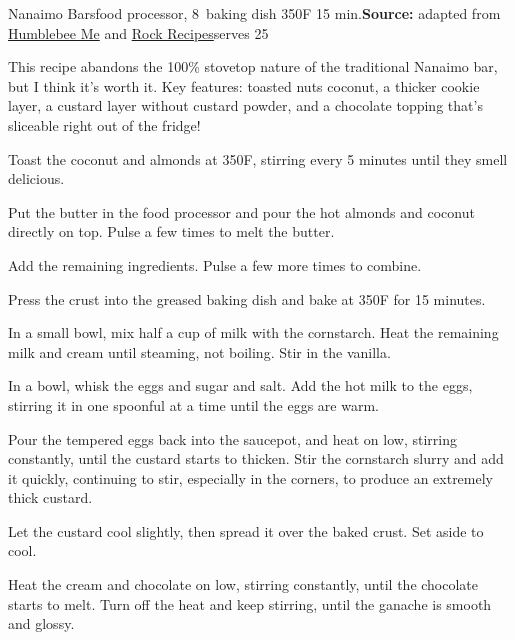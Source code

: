 \begin{recipe}{Nanaimo Bars}{food processor, 8\inch{}\inch\ baking dish \hfill 350\0F \hfill 15 min.}{\textbf{Source:} adapted from \href{https://www.humblebeeandme.com/totally-from-scratch-nanaimo-bars/}{Humblebee \And Me} and \href{https://www.rockrecipes.com/chocolate-mint-nanaimo-bars/}{Rock Recipes}\hfill serves 25}

 \freeform This recipe abandons the 100\% stovetop nature of the traditional Nanaimo bar, but I think it's worth it. Key features: toasted nuts \And coconut, a thicker cookie layer, a custard layer without custard powder, and a chocolate topping that's sliceable right out of the fridge!

 Toast the coconut and almonds at 350\0F, stirring every 5 minutes until they smell delicious.

 Put the butter in the food processor and pour the hot almonds and coconut directly on top. Pulse a few times to melt the butter.

 Add the remaining ingredients. Pulse a few more times to combine.

 \newstep Press the crust into the greased baking dish and bake at 350\0F for 15 minutes.

 In a small bowl, mix half a cup of milk with the cornstarch. Heat the remaining milk and cream until steaming, not boiling. Stir in the vanilla.

 In a bowl, whisk the eggs and sugar and salt. Add the hot milk to the eggs, stirring it in one spoonful at a time until the eggs are warm.

 \newstep Pour the tempered eggs back into the saucepot, and heat on low, stirring constantly, until the custard starts to thicken. Stir the cornstarch slurry and add it quickly, continuing to stir, especially in the corners, to produce an extremely thick custard.

 \newstep Let the custard cool slightly, then spread it over the baked crust. Set aside to cool.

 Heat the cream and chocolate on low, stirring constantly, until the chocolate starts to melt. Turn off the heat and keep stirring, until the ganache is smooth and glossy.


\end{recipe}
